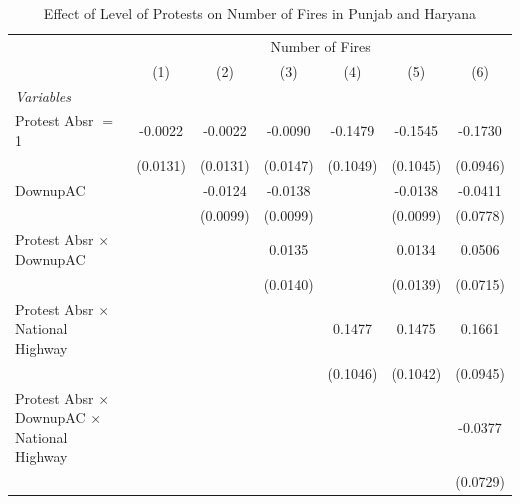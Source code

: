 
\begin{table}[htbp]
   \caption{\label{tab:protest_treat_main} Effect of Level of Protests on Number of Fires in Punjab and Haryana}
   \centering
   \begin{tabular}{lcccccc}
      \tabularnewline \midrule \midrule
       & \multicolumn{6}{c}{Number of Fires}\\
                                                                 & (1)           & (2)           & (3)           & (4)           & (5)           & (6)\\  
      \midrule
      \emph{Variables}\\
      Protest Absr $=$ 1                                         & -0.0022       & -0.0022       & -0.0090       & -0.1479       & -0.1545       & -0.1730\\   
                                                                 & (0.0131)      & (0.0131)      & (0.0147)      & (0.1049)      & (0.1045)      & (0.0946)\\   
      DownupAC                                                   &               & -0.0124       & -0.0138       &               & -0.0138       & -0.0411\\   
                                                                 &               & (0.0099)      & (0.0099)      &               & (0.0099)      & (0.0778)\\   
      Protest Absr $\times$ DownupAC                             &               &               & 0.0135        &               & 0.0134        & 0.0506\\   
                                                                 &               &               & (0.0140)      &               & (0.0139)      & (0.0715)\\   
      Protest Absr $\times$ National Highway                     &               &               &               & 0.1477        & 0.1475        & 0.1661\\   
                                                                 &               &               &               & (0.1046)      & (0.1042)      & (0.0945)\\   
      Protest Absr $\times$ DownupAC $\times$ National Highway   &               &               &               &               &               & -0.0377\\   
                                                                 &               &               &               &               &               & (0.0729)\\   

\end{tabular}
\end{table}
